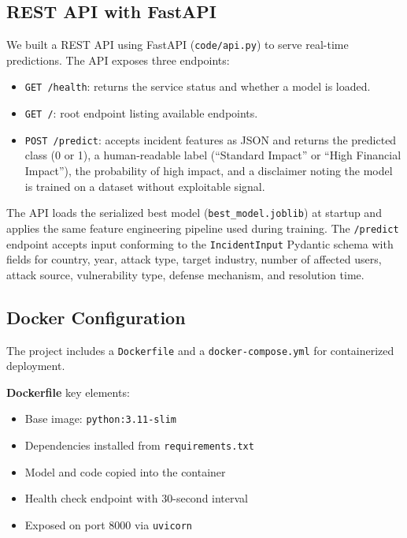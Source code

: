 \documentclass[a4paper,12pt]{article}
\begin{document}
\subsection{REST API with FastAPI}

We built a REST API using FastAPI (\texttt{code/api.py}) to serve real-time predictions. The API exposes three endpoints:

\begin{itemize}[leftmargin=2cm]
    \item \texttt{GET /health}: returns the service status and whether a model is loaded.
    \item \texttt{GET /}: root endpoint listing available endpoints.
    \item \texttt{POST /predict}: accepts incident features as JSON and returns the predicted class (0 or 1), a human-readable label (``Standard Impact'' or ``High Financial Impact''), the probability of high impact, and a disclaimer noting the model is trained on a dataset without exploitable signal.
\end{itemize}

The API loads the serialized best model (\texttt{best\_model.joblib}) at startup and applies the same feature engineering pipeline used during training. The \texttt{/predict} endpoint accepts input conforming to the \texttt{IncidentInput} Pydantic schema with fields for country, year, attack type, target industry, number of affected users, attack source, vulnerability type, defense mechanism, and resolution time.

\subsection{Docker Configuration}

The project includes a \texttt{Dockerfile} and a \texttt{docker-compose.yml} for containerized deployment.

\textbf{Dockerfile} key elements:
\begin{itemize}[leftmargin=2cm]
    \item Base image: \texttt{python:3.11-slim}
    \item Dependencies installed from \texttt{requirements.txt}
    \item Model and code copied into the container
    \item Health check endpoint with 30-second interval
    \item Exposed on port 8000 via \texttt{uvicorn}
\end{itemize}
\end{document}
